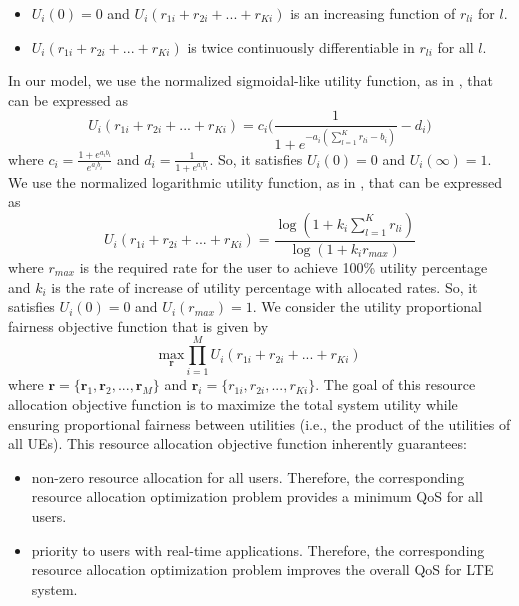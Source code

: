 \documentclass[journal]{IEEEtran} 		\usepackage{amsmath,amssymb}
\begin{document}
\begin{itemize}
\item $U_i(0) = 0$ and $U_i(r_{1i}+r_{2i}+ ...+r_{Ki})$ is an increasing function of $r_{li}$ for $l$.
\item $U_i(r_{1i}+r_{2i}+ ...+r_{Ki})$ is twice continuously differentiable in $r_{li}$ for all $l$.
\end{itemize}
In our model, we use the normalized sigmoidal-like utility function, as in \cite{DL_PowerAllocation}, that can be expressed as
\begin{equation}\label{eqn:sigmoid}
U_i(r_{1i}+r_{2i}+ ...+r_{Ki}) = c_i\Big(\frac{1}{1+e^{-a_i(\sum_{l=1}^{K}r_{li}-b_i)}}-d_i\Big)
\end{equation}
where $c_i = \frac{1+e^{a_ib_i}}{e^{a_ib_i}}$ and $d_i = \frac{1}{1+e^{a_ib_i}}$. So, it satisfies $U_i(0)=0$ and $U_i(\infty)=1$. We use the normalized logarithmic utility function, as in \cite{UtilityFairness}, that can be expressed as
\begin{equation}\label{eqn:log}
U_i(r_{1i}+r_{2i}+ ...+r_{Ki}) = \frac{\log(1+k_i\sum_{l=1}^{K}r_{li})}{\log(1+k_ir_{max})}
\end{equation}
where $r_{max}$ is the required rate for the user to achieve 100\% utility percentage and $k_i$ is the rate of increase of utility percentage with allocated rates. So, it satisfies $U_i(0)=0$ and $U_i(r_{max})=1$. We consider the utility proportional fairness objective function that is given by
\begin{equation}\label{eqn:utility_fairness}
\underset{\textbf{r}}{\text{max}} \prod_{i=1}^{M}U_i(r_{1i} + r_{2i} + ... + r_{Ki})
\end{equation}
where $\textbf{r} =\{\textbf{r}_1, \textbf{r}_2,..., \textbf{r}_M\}$ and $\textbf{r}_i =\{r_{1i}, r_{2i},..., r_{Ki}\}$. The goal of this resource allocation objective function is to maximize the total system utility while ensuring proportional fairness between utilities (i.e., the product of the utilities of all UEs). This resource allocation objective function inherently guarantees:\begin{itemize}
 \item non-zero resource allocation for all users. Therefore, the corresponding resource allocation optimization problem provides a minimum QoS for all users.
 \item  priority to users with real-time applications. Therefore, the corresponding resource allocation optimization problem improves the overall QoS for LTE system.
\end{itemize}
\end{document}
